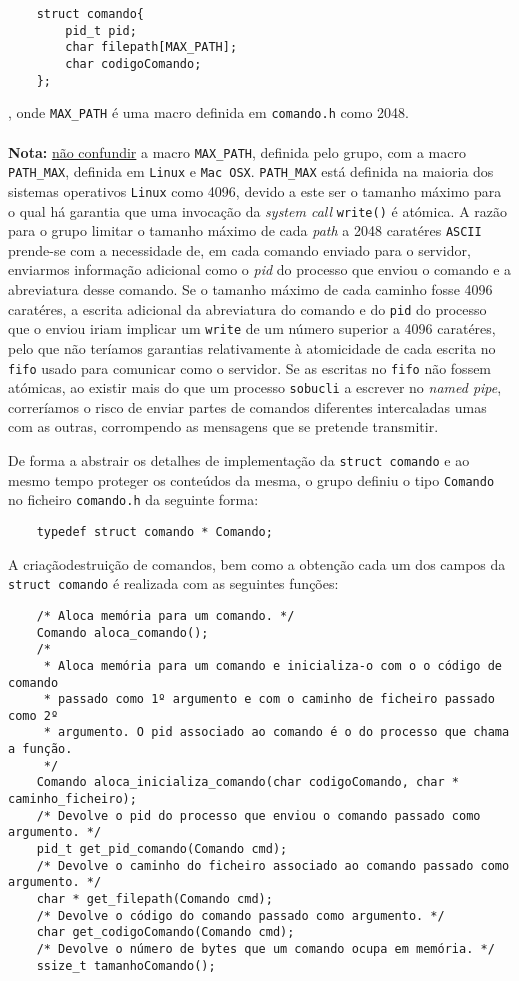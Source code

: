\documentclass[a4paper,12pt,titlepage,draft,portuguese]{article}
\begin{document}
	\begin{verbatim}
	struct comando{
		pid_t pid;
		char filepath[MAX_PATH];
		char codigoComando;
	};
	\end{verbatim}
, onde \texttt{MAX\_PATH} é uma macro definida em \texttt{comando.h} como 2048.
\\\\\textbf{Nota:} \underline{não confundir} a macro \texttt{MAX\_PATH}, definida pelo grupo, com a macro \texttt{PATH\_MAX}, definida em \texttt{Linux} e \texttt{Mac OSX}. \texttt{PATH\_MAX} está definida na maioria dos sistemas operativos \texttt{Linux} como 4096, devido a este ser o tamanho máximo para o qual há garantia que uma invocação da \emph{system call} \texttt{write()} é atómica. A razão para o grupo limitar o tamanho máximo de cada \emph{path} a 2048 caratéres \texttt{ASCII} prende-se com a necessidade de, em cada comando enviado para o servidor, enviarmos informação adicional como o \emph{pid} do processo que enviou o comando e a abreviatura desse comando. Se o tamanho máximo de cada caminho fosse 4096 caratéres, a escrita adicional da abreviatura do comando e do \texttt{pid} do processo que o enviou iriam implicar um \texttt{write} de um número superior a 4096 caratéres, pelo que não teríamos garantias relativamente à atomicidade de cada escrita no \texttt{fifo} usado para comunicar como o servidor. Se as escritas no \texttt{fifo} não fossem atómicas, ao existir mais do que um processo \texttt{sobucli} a escrever no \emph{named pipe}, correríamos o risco de enviar partes de comandos diferentes intercaladas umas com as outras, corrompendo as mensagens que se pretende transmitir.

De forma a abstrair os detalhes de implementação da \texttt{struct comando} e ao mesmo tempo proteger os conteúdos da mesma, o grupo definiu o tipo \texttt{Comando} no ficheiro \texttt{comando.h} da seguinte forma:

	\begin{verbatim}
	typedef struct comando * Comando;
	\end{verbatim}

A criação\/destruição de comandos, bem como a obtenção cada um dos campos da \texttt{struct comando} é realizada com as seguintes funções:

	\begin{verbatim}
	/* Aloca memória para um comando. */
	Comando aloca_comando();
	/* 
	 * Aloca memória para um comando e inicializa-o com o o código de comando
	 * passado como 1º argumento e com o caminho de ficheiro passado como 2º
	 * argumento. O pid associado ao comando é o do processo que chama a função.
	 */
	Comando aloca_inicializa_comando(char codigoComando, char * caminho_ficheiro);
	/* Devolve o pid do processo que enviou o comando passado como argumento. */
	pid_t get_pid_comando(Comando cmd);
	/* Devolve o caminho do ficheiro associado ao comando passado como argumento. */
	char * get_filepath(Comando cmd);
	/* Devolve o código do comando passado como argumento. */
	char get_codigoComando(Comando cmd);
	/* Devolve o número de bytes que um comando ocupa em memória. */
	ssize_t tamanhoComando();
	\end{verbatim}
\end{document}
